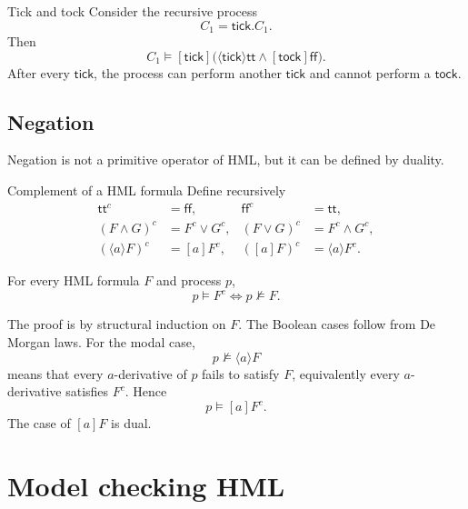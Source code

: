 \documentclass[a4paper]{article}
\newcommand{\ttt}{\mathsf{tt}}
\newcommand{\fff}{\mathsf{ff}}
\begin{document}
\begin{snippetexample}{Tick and tock}
    Consider the recursive process
    \[
        C_1 = \mathsf{tick}.C_1.
    \]
    Then
    \[
        C_1\models
        [\mathsf{tick}]
        \bigl(
            \langle\mathsf{tick}\rangle\ttt
            \land
            [\mathsf{tock}]\fff
        \bigr).
    \]
    After every \(\mathsf{tick}\), the process can perform another \(\mathsf{tick}\) and cannot perform a \(\mathsf{tock}\).
\end{snippetexample}

\subsection{Negation}

Negation is not a primitive operator of HML, but it can be defined by duality.

\begin{snippetdefinition}{Complement of a HML formula}
    Define recursively
    \begin{align*}
        \ttt^c &= \fff,
        &\fff^c &= \ttt,\\
        (F\land G)^c &= F^c\lor G^c,
        &(F\lor G)^c &= F^c\land G^c,\\
        (\langle a\rangle F)^c &= [a]F^c,
        &([a]F)^c &= \langle a\rangle F^c.
    \end{align*}
\end{snippetdefinition}

\begin{snippettheorem}{}
    For every HML formula \(F\) and process \(p\),
    \[
        p\models F^c
        \iff
        p\not\models F.
    \]
\end{snippettheorem}

\begin{snippetproof}{}
    The proof is by structural induction on \(F\).
    The Boolean cases follow from De Morgan laws.
    For the modal case,
    \[
        p\not\models\langle a\rangle F
    \]
    means that every \(a\)-derivative of \(p\) fails to satisfy \(F\), equivalently every \(a\)-derivative satisfies \(F^c\).
    Hence
    \[
        p\models[a]F^c.
    \]
    The case of \([a]F\) is dual.
\end{snippetproof}

\section{Model checking HML}
\end{document}
